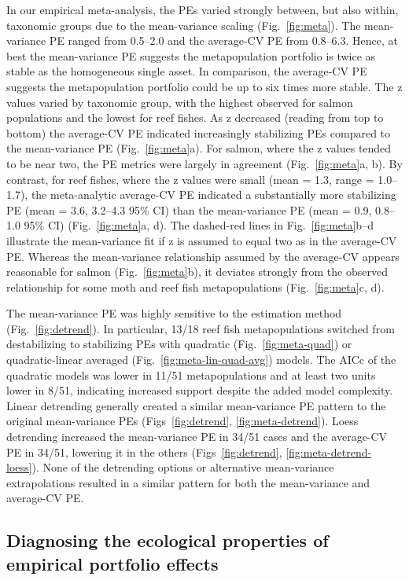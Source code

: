 In our empirical meta-analysis, the PEs varied strongly between, but also
within, taxonomic groups due to the mean-variance scaling
(Fig.~\ref{fig:meta}). The mean-variance PE ranged from
0.5--2.0 and the average-CV PE from
0.8--6.3. Hence, at best the
mean-variance PE suggests the metapopulation portfolio is twice as stable as
the homogeneous single asset. In comparison, the average-CV PE suggests the
metapopulation portfolio could be up to six times more stable. The z values
varied by taxonomic group, with the highest observed for salmon populations and
the lowest for reef fishes. As z decreased (reading from top to bottom) the
average-CV PE indicated increasingly stabilizing PEs compared to the
mean-variance PE (Fig.~\ref{fig:meta}a). For salmon, where the z values tended
to be near two, the PE metrics were largely in agreement (Fig.~\ref{fig:meta}a,
b). By contrast, for reef fishes, where the z values were small (mean =
1.3, range = 1.0--1.7),
the meta-analytic average-CV PE indicated a substantially more stabilizing PE
(mean = 3.6,
3.2--4.3 95\% CI) than the
mean-variance PE (mean = 0.9,
0.8--1.0 95\% CI) (Fig.~\ref{fig:meta}a,
d). The dashed-red lines in Fig.~\ref{fig:meta}b--d illustrate the
mean-variance fit if z is assumed to equal two as in the average-CV PE. Whereas
the mean-variance relationship assumed by the average-CV appears reasonable for
salmon (Fig.~\ref{fig:meta}b), it deviates strongly from the observed
relationship for some moth and reef fish metapopulations (Fig.~\ref{fig:meta}c,
d).

The mean-variance PE was highly sensitive to the estimation method
(Fig.~\ref{fig:detrend}). In particular,
13/18 reef fish metapopulations
switched from destabilizing to stabilizing PEs with quadratic
(Fig.~\ref{fig:meta-quad}) or quadratic-linear averaged
(Fig.~\ref{fig:meta-lin-quad-avg}) models. The AICc of the quadratic models was
lower in 11/51 metapopulations and at least two
units lower in 8/51, indicating
increased support despite the added model complexity. Linear
detrending generally created a similar mean-variance PE pattern to the original
mean-variance PEs (Figs~\ref{fig:detrend}, \ref{fig:meta-detrend}). Loess
detrending increased the mean-variance PE in
34/51 cases and the average-CV PE
in 34/51, lowering it in the
others (Figs~\ref{fig:detrend}, \ref{fig:meta-detrend-loess}). None of the
detrending options or alternative mean-variance extrapolations resulted in a
similar pattern for both the mean-variance and average-CV PE.

\subsection{Diagnosing the ecological properties of empirical portfolio effects}

